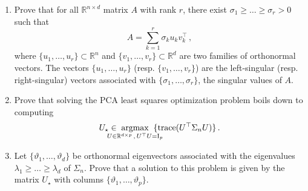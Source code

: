 \documentclass[a4paper,10pt,fleqn]{article}
\newcommand{\eqsp}{\,}
\newcommand{\rset}{\ensuremath{\mathbb{R}}}
\newcommand{\1}{\ensuremath{\mathbbm{1}}}
\newcommand{\bfU}{U}
\newcommand{\bfX}{X}
\newcommand{\bfs}{\Sigma}
\newcommand{\bfA}{A}
\newcommand{\bfV}{V}
\newcommand{\bfI}{\mathrm{I}}
\newcommand{\bfD}{D}
\begin{document}
\begin{enumerate}
\item Prove that for all $\rset^{n \times d}$ matrix $\bfA$ with rank $r$, there exist $\sigma_1\geqslant \ldots \geqslant \sigma_r>0$ such that
$$
\bfA = \sum_{k=1}^r \sigma_k u_k v^\top_k\eqsp,
$$
where $\{u_1,\ldots,u_r\}\subset \rset^n$ and $\{v_1,\ldots,v_r \} \subset \rset^d$ are two families of orthonormal  vectors. The vectors $\{u_1,\ldots,u_r\}$  (resp. $\{v_1,\ldots,v_r\}$) are the left-singular (resp. right-singular) vectors associated with $\{\sigma_1,\ldots,\sigma_r\}$, the singular values of $\bfA$.
\item Prove that solving the PCA least squares optimization problem boils down to computing
$$
\bfU_{\star} \in \hspace{-0.5cm}\underset{\bfU\in \rset^{d\times p}\eqsp,\eqsp \bfU^\top\bfU = \bfI_p}{\mathrm{argmax}} \hspace{-.4cm}\{ \mathrm{trace}(\bfU^\top\bfs_n\bfU)\}\eqsp.
$$
\item Let $\{\vartheta_1,\ldots,\vartheta_d\}$ be orthonormal eigenvectors associated with the eigenvalues $\lambda_1\geqslant \ldots \geqslant \lambda_d$ of $\bfs_n$. Prove that a solution to this problem is given by the matrix $\bfU_{\star}$ with columns $\{\vartheta_1,\ldots,\vartheta_p\}$.

\end{enumerate}
\end{document}
